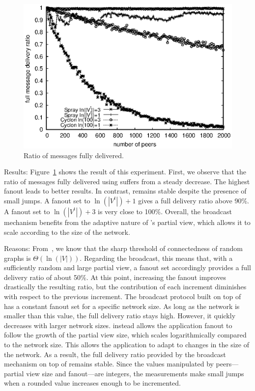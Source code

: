 \begin{asparadesc}
\begin{figure}
  \begin{center}
    \includegraphics[width=\SCALE\textwidth]{img/hardrate.eps}
    \caption{\label{fig:hardrate}Ratio of messages fully delivered.}
  \end{center}
\end{figure}

\item [Results:] Figure~\ref{fig:hardrate} shows the result of this
  experiment. First, we observe that the ratio of messages fully delivered using
  \CYCLON suffers from a steady decrease. The highest fanout leads to better
  results. In contrast, \SPRAY remains stable despite the presence of small
  jumps. A fanout set to $\ln(|V^t|)+1$ gives a full delivery ratio above 90\%. A
  fanout set to $\ln(|V^t|)+3$ is very close to 100\%. Overall, the broadcast
  mechanism benefits from the adaptive nature of \SPRAY's partial view, which
  allows it to scale according to the size of the network.
\item [Reasons:] From~\cite{erdos1959random}, we know that the sharp
  threshold of connectedness of random graphs is
  $\Theta(\ln(|V|))$. Regarding the broadcast, this means that, with a
  sufficiently random and large partial view, a fanout set accordingly
  provides a full delivery ratio of about 50\%. At this point,
  increasing the fanout improves drastically the resulting ratio, but
  the contribution of each increment diminishes with respect to the
  previous increment. The broadcast protocol built on top of \CYCLON
  has a constant fanout set for a specific network size. As long as
  the network is smaller than this value, the full delivery ratio stays
  high. However, it quickly decreases with larger network sizes.
  \SPRAY instead allows the application fanout to follow the growth of
  the partial view size, which scales logarithmically compared to the
  network size. This allows the application to adapt to changes in the
  size of the network. As a result, the full delivery ratio provided by
  the broadcast mechanism on top of \SPRAY remains stable. Since the
  values manipulated by peers---partial view size and fanout---are
  integers, the measurements make small jumps when a rounded value
  increases enough to be incremented.
\end{asparadesc}

